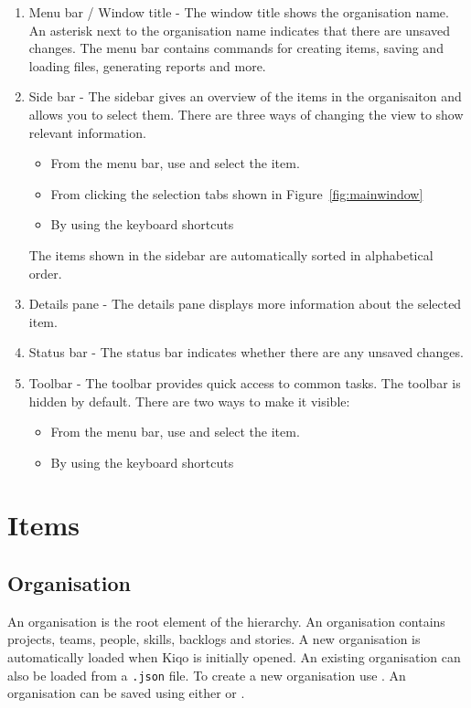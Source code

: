 \documentclass[11pt,fleqn]{book} %
\begin{document}
\begin{enumerate}
\item Menu bar / Window title - The window title shows the organisation name. An asterisk next to the organisation name indicates that there are unsaved changes.
The menu bar contains commands for creating items, saving and loading files, generating reports and more.
\item Side bar - The sidebar gives an overview of the items in the organisaiton and allows you to select them.
There are three ways of changing the view to show relevant information.
    \begin{itemize}
      \item From the menu bar, use  and select the item.
      \item From clicking the selection tabs shown in Figure~\ref{fig:mainwindow}
      \item By using the keyboard shortcuts 
    \end{itemize}
    The items shown in the sidebar are automatically sorted in alphabetical order.
\item Details pane - The details pane displays more information about the selected item.
\item Status bar - The status bar indicates whether there are any unsaved changes.
\item Toolbar - The toolbar provides quick access to common tasks.
   The toolbar is hidden by default. There are two ways to make it visible:
    \begin{itemize}
      \item From the menu bar, use  and select the item.
      \item By using the keyboard shortcuts \keys{\ctrl + /}
    \end{itemize}
\end{enumerate}


\chapter{Items}
\section{Organisation}
An organisation is the root element of the hierarchy. An organisation contains projects, teams, people, skills, backlogs and stories.
A new organisation is automatically loaded when Kiqo is initially opened. An existing organisation can also be loaded
from a {\tt .json} file. To create a new organisation use . An organisation can be saved using
either  or .
\end{document}
